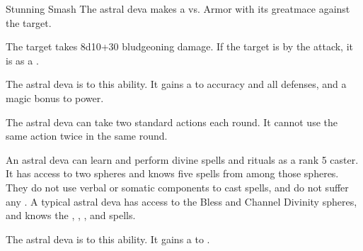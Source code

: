     \begin{freeability}{Stunning Smash}
       The astral deva makes a 
         vs. Armor
        with its greatmace against the target.
    
    \hit The target takes 8d10+30 bludgeoning damage. If the target is  by the attack, it is  as a .
    \end{freeability}
  
      
              The astral deva is  to this ability.
              It gains a   to accuracy and all defenses, and a  magic bonus to power.
            
              The astral deva can take two standard actions each round.
              It cannot use the same action twice in the same round.
            
              An astral deva can learn and perform divine spells and rituals as a rank 5 caster.
              It has access to two spheres and knows five spells from among those spheres.
              They do not use verbal or somatic components to cast spells, and do not suffer any .
              A typical astral deva has access to the Bless and Channel Divinity spheres, and knows the , , ,  and  spells.
            
              The astral deva is  to this ability.
              It gains a   to .
  

